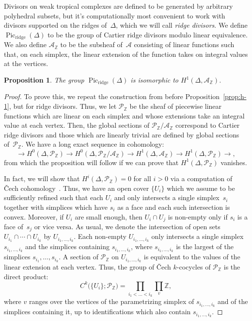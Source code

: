 \documentclass[11pt]{amsart}
\newtheorem{prop}[thm]{Proposition}
\theoremstyle{definition}
\newcommand{\cA}{\mathcal A}
\newcommand{\cP}{\mathcal P}
\newcommand{\defi}[1]{\emph{#1}}
\newcommand{\Pic}{\operatorname{Pic}}
\newcommand{\ridge}{\operatorname{ridge}}
\newcommand{\ZZ}{\mathbb Z}
\begin{document}
Divisors on weak tropical complexes are defined to be generated by arbitrary polyhedral subsets, but it's
computationally most convenient to work with divisors supported on the ridges
of~$\Delta$, which we will call \defi{ridge divisors}. We define
$\Pic_{\ridge}(\Delta)$ to be the group of Cartier ridge divisors modulo linear
equivalence. We also define $\cA_\ZZ$ to be the subsheaf of~$\cA$ consisting of
linear functions such that, on each simplex, the linear extension of the
function takes on integral values at the vertices.

\begin{prop}\label{prop:ridge-divisors}
The group $\Pic_{\ridge}(\Delta)$ is
isomorphic to $H^1(\Delta, \cA_\ZZ)$.
\end{prop}

\begin{proof}
To prove this, we repeat the construction from before
Proposition~\ref{prop:h-1}, but for ridge divisors. Thus, we let $\cP_\ZZ$ be
the sheaf of piecewise linear
functions which are linear on each simplex and whose extensions take an integral
value at each vertex. Then, the global sections of $\cP_\ZZ / \cA_\ZZ$
correspond to Cartier ridge divisors and those which are linearly trivial are
defined by global sections of~$\cP_\ZZ$. We have a long exact sequence in
cohomology:
\begin{equation*}
\rightarrow
H^0(\Delta, \cP_\ZZ) \rightarrow
H^0(\Delta, \cP_\ZZ / \cA_\ZZ) \rightarrow
H^1(\Delta, \cA_\ZZ) \rightarrow
H^1(\Delta, \cP_\ZZ) \rightarrow,
\end{equation*}
from which
the proposition will follow if we can prove that $H^1(\Delta, \cP_\ZZ)$
vanishes.

In fact, we will show that $H^i(\Delta, \cP_\ZZ) = 0$ for all $i > 0$ via a
computation of \v Cech cohomology~\cite[Thm.~II.5.10.1]{godement}. Thus, we have
an open cover $\{U_i\}$ which we assume to be sufficiently refined such that
each $U_i$ and only intersects a single simplex~$s_i$ together with
simplices which have $s_i$ as a face and each such intersection is convex.
Moreover, if $U_i$ are small enough, then $U_i \cap U_j$ is non-empty only if
$s_i$ is a face of~$s_j$ or vice versa. As usual, we denote the intersection of
open sets $U_{i_1} \cap \cdots \cap U_{i_k}$ by $U_{i_1, \ldots, i_k}$. Each
non-empty $U_{i_1, \ldots, i_k}$ only intersects a single simplex $s_{i_1,
\ldots, i_k}$ and the simplices containing $s_{i_1, \ldots, i_k}$, where
$s_{i_1, \ldots, i_k}$ is the largest of the simplices $s_{i_1}, \ldots,
s_{i_k}$. A section of $\cP_\ZZ$
on $U_{i_1, \ldots, i_k}$ is equivalent to the values of the linear extension at
each vertex. Thus, the group of \v Cech $k$-cocycles of $\cP_\ZZ$ is the direct
product:
\begin{equation}\label{eq:cech-cocycles-1}
C^k\big(\{U_i\}; \cP_\ZZ\big) = 
\prod_{i_1 < \ldots < i_k} \prod_{v} \ZZ,
\end{equation}
where $v$ ranges over the vertices of the parametrizing simplex of $s_{i_1,
\ldots, i_k}$ and of the simplices containing it, up to identifications which
also contain $s_{i_1, \ldots, i_k}$.


\end{proof}
\end{document}
